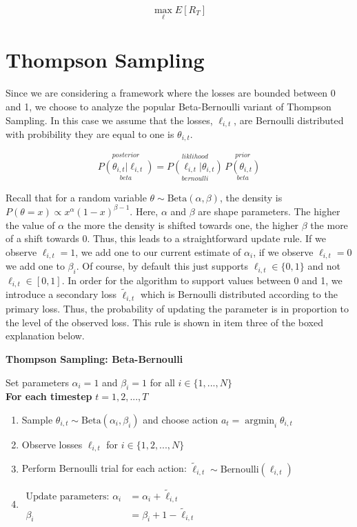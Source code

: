 \documentclass[10pt,a4paper]{article} %
\DeclareMathOperator*{\argmin}{argmin}
\begin{document}
	$$ \max_\ell E [R_T] $$
	
	\section{Thompson Sampling}
	
	Since we are considering a framework where the losses are bounded between 0 and 1, we choose to analyze the popular Beta-Bernoulli variant of Thompson Sampling.  In this case we assume that the losses, $\ell_{i, t}$, are Bernoulli distributed with probibility they are equal to one is $\theta_{i, t}$.
	
	$$\overset{posterior}{\underset{beta}{P(\theta_{i, t} | \ell_{i, t})}} = 
		\overset{liklihood}{\underset{bernoulli}{P(\ell_{i, t} | \theta_{i, t})}} \, 
		\overset{prior}{\underset{beta}{P(\theta_{i, t})}}$$
	
	Recall that for a random variable $\theta \sim \text{Beta}(\alpha, \beta)$, the density is $P(\theta = x) \propto x^\alpha (1 - x)^{\beta-1} $.  Here, $\alpha$ and $\beta$ are shape parameters.  The higher the value of $\alpha$ the more the density is shifted towards one, the higher $\beta$ the more of a shift towards 0.  Thus, this leads to a straightforward update rule.  If we observe $\ell_{i, t} = 1$, we add one to our current estimate of $\alpha_i$, if we observe $\ell_{i, t} = 0$ we add one to $\beta_i$.  Of course, by default this just supports $\ell_{i, t} \in \{0, 1\}$ and not $\ell_{i, t} \in \left[ 0, 1 \right]$.  In order for the algorithm to support values between 0 and 1, we introduce a secondary loss $\widetilde{\ell}_{i, t}$ which is Bernoulli distributed according to the primary loss.  Thus, the probability of updating the parameter is in proportion to the level of the observed loss.  This rule is shown in item three of the boxed explanation below.
		
	\centerline{\textbf{Thompson Sampling: Beta-Bernoulli}} 
	\noindent\begin{boxedminipage}{\textwidth}
		Set parameters $\alpha_i = 1$ and $\beta_i = 1$ for all $i \in \{1, ..., N\}$\\
		\textbf{For each timestep} $t = 1, 2, ..., T$
		\begin{enumerate}
			\item Sample $\theta_{i, t} \sim \text{Beta}(\alpha_i, \beta_i)$ and choose action $a_t = \argmin_i \theta_{i, t}$
			\item Observe losses $\ell_{i, t}$ for $i \in \{1, 2, ..., N\}$
			\item Perform Bernoulli trial for each action: $\widetilde{\ell}_{i, t} \sim \text{Bernoulli}(\ell_{i, t})$
			\item $
			\begin{aligned}			
			\text{Update parameters: } \alpha_i &= \alpha_i + \widetilde{\ell}_{i, t} \\
			\beta_i &= \beta_i + 1 - \widetilde{\ell}_{i, t}
			\end{aligned}
			$
		\end{enumerate}
	\end{boxedminipage}
\end{document}
